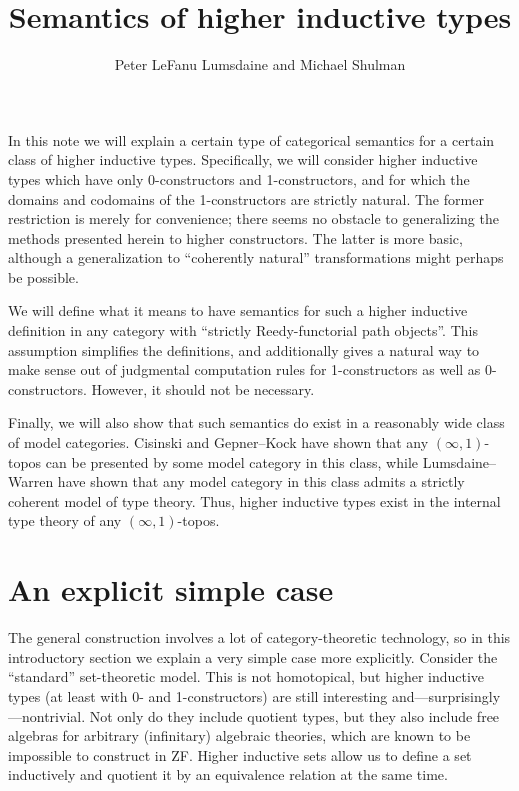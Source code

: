\documentclass{amsart}
\title{Semantics of higher inductive types}
\author{Peter LeFanu Lumsdaine and Michael Shulman}
\begin{document}
\maketitle

In this note we will explain a certain type of categorical semantics for a certain class of higher inductive types.
Specifically, we will consider higher inductive types which have only 0-constructors and 1-constructors, and for which the domains and codomains of the 1-constructors are strictly natural.
The former restriction is merely for convenience; there seems no obstacle to generalizing the methods presented herein to higher constructors.
The latter is more basic, although a generalization to ``coherently natural'' transformations might perhaps be possible.

We will define what it means to have semantics for such a higher inductive definition in any category with ``strictly Reedy-functorial path objects''.
This assumption simplifies the definitions, and additionally gives a natural way to make sense out of judgmental computation rules for 1-constructors as well as 0-constructors.
However, it should not be necessary.

Finally, we will also show that such semantics do exist in a reasonably wide class of model categories.
Cisinski and Gepner--Kock have shown that any $(\infty,1)$-topos can be presented by some model category in this class, while Lumsdaine--Warren have shown that any model category in this class admits a strictly coherent model of type theory.
Thus, higher inductive types exist in the internal type theory of any $(\infty,1)$-topos.

\section{An explicit simple case}
\label{sec:simplified-example}

The general construction involves a lot of category-theoretic technology, so in this introductory section we explain a very simple case more explicitly.
Consider the ``standard'' set-theoretic model.
This is not homotopical, but higher inductive types (at least with 0- and 1-constructors) are still interesting and---surprisingly---nontrivial.
Not only do they include quotient types, but they also include free algebras for arbitrary (infinitary) algebraic theories, which are known to be impossible to construct in ZF.
Higher inductive sets allow us to define a set inductively and quotient it by an equivalence relation at the same time.
\end{document}
